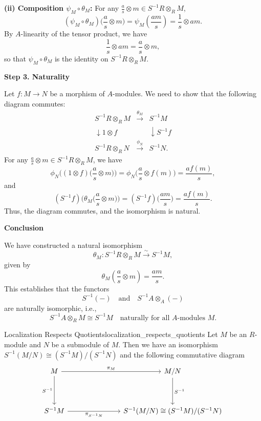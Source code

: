 \begin{prf}
\textbf{(ii) Composition \(\psi_M \circ \theta_M\):} For any \(\frac{a}{s} \otimes m \in S^{-1}R \otimes_R M\),
\[
(\psi_M \circ \theta_M)\Big(\frac{a}{s} \otimes m\Big) = \psi_M\left(\frac{am}{s}\right) = \frac{1}{s} \otimes am.
\]
By \(A\)-linearity of the tensor product, we have
\[
\frac{1}{s} \otimes am = \frac{a}{s} \otimes m,
\]
so that \(\psi_M \circ \theta_M\) is the identity on \(S^{-1}R \otimes_R M\).

\vspace{1em}
\textbf{Step 3. Naturality}

Let \(f: M \to N\) be a morphism of \(A\)-modules. We need to show that the following diagram commutes:
\[
\begin{array}{ccc}
S^{-1}R \otimes_R M & \xrightarrow{\theta_M} & S^{-1}M \\[1ex]
\downarrow{1\otimes f} &  & \downarrow{S^{-1}f} \\[1ex]
S^{-1}R \otimes_R N & \xrightarrow{\phi_N} & S^{-1}N.
\end{array}
\]
For any \(\frac{a}{s} \otimes m \in S^{-1}R \otimes_R M\), we have
\[
\phi_N\Big((1\otimes f)\Big(\frac{a}{s} \otimes m\Big)\Big) = \phi_N\Big(\frac{a}{s} \otimes f(m)\Big) = \frac{af(m)}{s},
\]
and
\[
(S^{-1}f)\Big(\theta_M\Big(\frac{a}{s} \otimes m\Big)\Big) = (S^{-1}f)\Big(\frac{am}{s}\Big) = \frac{af(m)}{s}.
\]
Thus, the diagram commutes, and the isomorphism is natural.

\vspace{1em}
\textbf{Conclusion}

We have constructed a natural isomorphism
\[
\theta_M: S^{-1}R \otimes_R M \xrightarrow{\sim} S^{-1}M,
\]
given by
\[
\theta_M\left(\frac{a}{s} \otimes m\right) = \frac{am}{s}.
\]
This establishes that the functors
\[
S^{-1}(-) \quad \text{and} \quad S^{-1}A\otimes_A(-)
\]
are naturally isomorphic, i.e.,
\[
S^{-1}A\otimes_R M \cong S^{-1}M \quad \text{naturally for all } A\text{-modules } M.
\]
\end{prf}


\begin{proposition}{Localization Respects Quotients}{localization_respects_quotients}
    Let $M$ be an $R$-module and $N$ be a submodule of $M$. Then we have an isomorphism $S^{-1}(M/N)\cong (S^{-1}M)/(S^{-1}N)$ and the following commutative diagram
    \[
        \begin{tikzcd}
            M \arrow[r, "\pi_M"] \arrow[d, "S^{-1}"'] &[+5em] M/N \arrow[d, "S^{-1}"]              \\[+2em]
            S^{-1}M \arrow[r, "\pi_{S^{-1}N}"']       & S^{-1}(M/N)\cong (S^{-1}M)/(S^{-1}N)
            \end{tikzcd}
    \]
\end{proposition}

